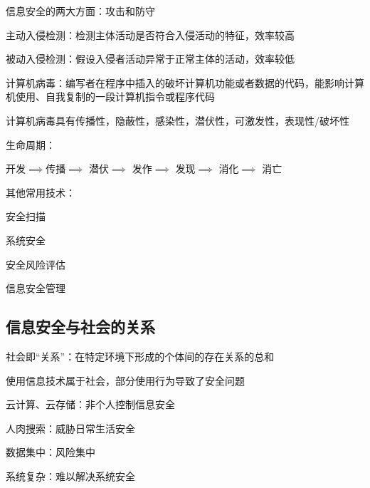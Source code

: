 \begin{notation}
    信息安全的两大方面：攻击和防守
\end{notation}
\begin{notation}
    主动入侵检测：检测主体活动是否符合入侵活动的特征，效率较高

    被动入侵检测：假设入侵者活动异常于正常主体的活动，效率较低
\end{notation}
\begin{defi}
    计算机病毒：编写者在程序中插入的破坏计算机功能或者数据的代码，能影响计算机使用、自我复制的一段计算机指令或程序代码

    计算机病毒具有传播性，隐蔽性，感染性，潜伏性，可激发性，表现性/破坏性

    生命周期：

    开发$\implies$传播$\implies$ 潜伏$\implies$ 发作$\implies$ 发现$\implies$ 消化$\implies$ 消亡
\end{defi}
其他常用技术：

安全扫描

系统安全

安全风险评估

信息安全管理
\subsection{信息安全与社会的关系}%
\label{sub:信息安全与社会的关系}
\begin{defi}
    社会即“关系”：在特定环境下形成的个体间的存在关系的总和
\end{defi}
使用信息技术属于社会，部分使用行为导致了安全问题
\begin{eg}
    云计算、云存储：非个人控制信息安全

    人肉搜索：威胁日常生活安全

    数据集中：风险集中

    系统复杂：难以解决系统安全
\end{eg}

